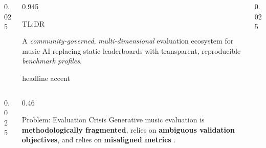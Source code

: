 \documentclass{beamer}
\begin{document}
\begin{frame}[t]
    \vspace{-14mm}

    \begin{columns}[t]
        \begin{column}{0.025\paperwidth}\end{column} %
        \begin{column}{0.945\paperwidth}
            \begin{block}{TL;DR}
                \begin{center}
                    A \textit{community-governed}, \textit{multi-dimensional} evaluation ecosystem for music AI replacing static leaderboards with transparent, reproducible \textit{benchmark profiles}.
                \end{center}
            \end{block}
            \vspace{-2ex}
            \begin{beamercolorbox}[wd=\columnwidth,ht=.2ex]{headline accent}\end{beamercolorbox}
        \end{column}

        \begin{column}{0.025\paperwidth}\end{column} %
    \end{columns}
  
  \begin{columns}[t]
    \begin{column}{0.025\paperwidth}\end{column}

    \begin{column}{0.46\paperwidth}

      \begin{block}{Problem: Evaluation Crisis}
          Generative music evaluation is \textbf{methodologically fragmented}, relies on \textbf{ambiguous validation objectives}, and relies on \textbf{misaligned metrics} \cite{lerch_survey_2025}. %
        

\end{block}
\end{column}
\end{columns}
\end{frame}
\end{document}
